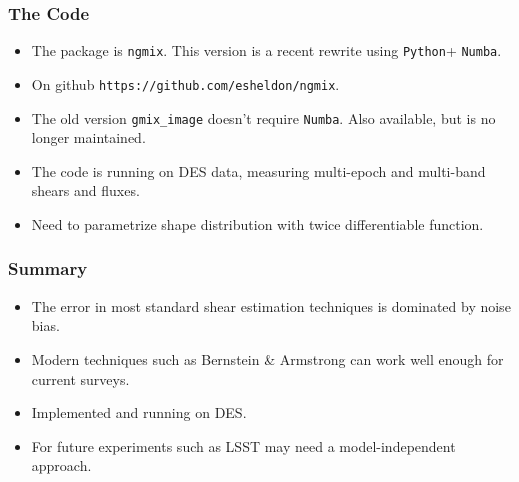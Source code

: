 \documentclass{beamer}
\newcommand{\numba}{\texttt{Numba}}
\newcommand{\python}{\texttt{Python}}
\newcommand{\ngmix}{\texttt{ngmix}}
\begin{document}
\frame
{
    \frametitle{The Code}

    \begin{itemize}

        \item The package is \ngmix.  This version is a recent rewrite
            using {\texttt \python + \numba}.

        \item On github  \texttt{https://github.com/esheldon/ngmix}. 
            
        \item The old version \texttt{gmix\_image} doesn't require \numba.
            Also available, but is no longer maintained.

        \item The code is running on DES data, measuring multi-epoch and
            multi-band shears and fluxes.  
            
        \item Need to parametrize shape distribution with twice differentiable
            function.

    \end{itemize}
}
\frame
{
    \frametitle{Summary}

    \begin{itemize}

        \item The error in most standard shear estimation techniques is
            dominated by noise bias.

        \item Modern techniques such as Bernstein \& Armstrong can work well
            enough for current surveys.

        \item Implemented and running on DES.

        \item For future experiments such as LSST may need a model-independent
            approach.

    \end{itemize}
}
\end{document}
